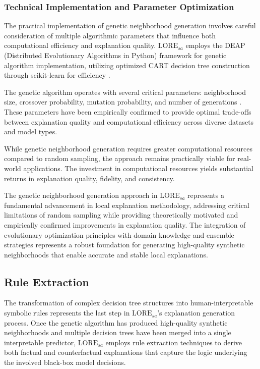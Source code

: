 \subsubsection{Technical Implementation and Parameter Optimization}
The practical implementation of genetic neighborhood generation involves careful consideration of multiple algorithmic parameters that influence both computational efficiency and explanation quality. $\text{LORE}_{sa}$ employs the DEAP (Distributed Evolutionary Algorithms in Python) \cite{Fortin2012DEAPEA} framework for genetic algorithm implementation, utilizing optimized CART \cite{ClassificationandRegressionTrees, IntroductiontoDataMining} decision tree construction through scikit-learn for efficiency \cite{guidotti2022stable}.

The genetic algorithm operates with several critical parameters: neighborhood size, crossover probability, mutation probability, and number of generations \cite{guidotti2022stable}. These parameters have been empirically confirmed to provide optimal trade-offs between explanation quality and computational efficiency across diverse datasets and model types.

While genetic neighborhood generation requires greater computational resources compared to random sampling, the approach remains practically viable for real-world applications. 
The investment in computational resources yields substantial returns in explanation quality, fidelity, and consistency.

The genetic neighborhood generation approach in $\text{LORE}_{sa}$ represents a fundamental advancement in local explanation methodology, addressing critical limitations of random sampling while providing theoretically motivated and empirically confirmed improvements in explanation quality. The integration of evolutionary optimization principles with domain knowledge and ensemble strategies represents a robust foundation for generating high-quality synthetic neighborhoods that enable accurate and stable local explanations.

\subsection{Rule Extraction}

The transformation of complex decision tree structures into human-interpretable symbolic rules represents the last step in $\text{LORE}_{sa}$'s explanation generation process. Once the genetic algorithm has produced high-quality synthetic neighborhoods and multiple decision trees have been merged into a single interpretable predictor, $\text{LORE}_{sa}$ employs rule extraction techniques to derive both factual and counterfactual explanations that capture the logic underlying the involved black-box model decisions.

